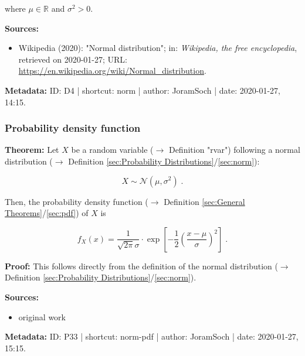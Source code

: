 \documentclass[a4paper,12pt]{book}
\begin{document}
where $\mu \in \mathbb{R}$ and $\sigma^2 > 0$.

\vspace{1em}
\textbf{Sources:}
\begin{itemize}
\item Wikipedia (2020): "Normal distribution"; in: \textit{Wikipedia, the free encyclopedia}, retrieved on 2020-01-27; URL: \url{https://en.wikipedia.org/wiki/Normal_distribution}.
\end{itemize}


\vspace{1em}
\textbf{Metadata:} ID: D4 | shortcut: norm | author: JoramSoch | date: 2020-01-27, 14:15.


\subsubsection[\textbf{Probability density function}]{Probability density function} \label{sec:norm-pdf}

\vspace{1em}
\textbf{Theorem:} Let $X$ be a random variable ($\rightarrow$ Definition "rvar") following a normal distribution ($\rightarrow$ Definition \ref{sec:Probability Distributions}/\ref{sec:norm}):

\begin{equation} \label{eq:norm-pdf-norm}
X \sim \mathcal{N}(\mu, \sigma^2) \; .
\end{equation}

Then, the probability density function ($\rightarrow$ Definition \ref{sec:General Theorems}/\ref{sec:pdf}) of $X$ is

\begin{equation} \label{eq:norm-pdf-norm-pdf}
f_X(x) = \frac{1}{\sqrt{2 \pi} \sigma} \cdot \exp \left[ -\frac{1}{2} \left( \frac{x-\mu}{\sigma} \right)^2 \right] \; .
\end{equation}


\vspace{1em}
\textbf{Proof:} This follows directly from the definition of the normal distribution ($\rightarrow$ Definition \ref{sec:Probability Distributions}/\ref{sec:norm}).

\vspace{1em}
\textbf{Sources:}
\begin{itemize}
\item original work\end{itemize}


\vspace{1em}
\textbf{Metadata:} ID: P33 | shortcut: norm-pdf | author: JoramSoch | date: 2020-01-27, 15:15.
\end{document}
